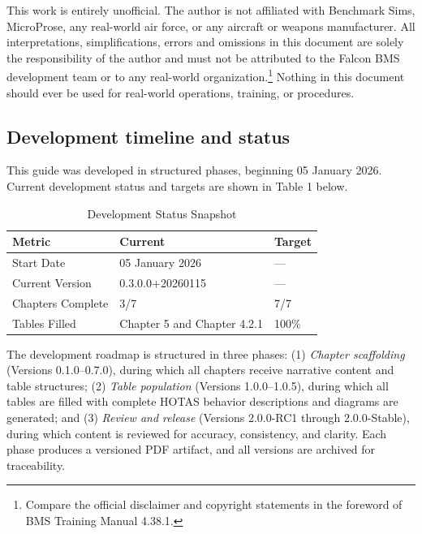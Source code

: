 \documentclass[11pt,a4paper]{article}
\providecommand{\trnman}{BMS Training Manual 4.38.1}
\newcommand{\docversion}{0.3.0.0} %
\newcommand{\docbuild}{20260115}
\newcommand{\docstartdate}{05 January 2026}
\newcommand{\chapterscompletedof}{3/7}
\newcommand{\tablesfilledpct}{Chapter 5 and Chapter 4.2.1}
\newcommand{\fulldocversion}{\docversion+\docbuild} %
\begin{document}
This work is entirely unofficial. The author is not affiliated with Benchmark Sims, MicroProse, any real-world air force, or any aircraft or weapons manufacturer. All interpretations, simplifications, errors and omissions in this document are solely the responsibility of the author and must not be attributed to the Falcon BMS development team or to any real-world organization.\footnote{Compare the official disclaimer and copyright statements in the foreword of \trnman{}.} Nothing in this document should ever be used for real-world operations, training, or procedures.

\subsection{Development timeline and status}

This guide was developed in structured phases, beginning \docstartdate{}. Current development status and targets are shown in Table 1 below.

\begin{table}[h]
\centering
\caption{Development Status Snapshot}
\begin{tabular}{L{3.2cm} L{2.5cm} L{2.5cm}}
\toprule
\textbf{Metric} & \textbf{Current} & \textbf{Target} \\
\midrule
Start Date & \docstartdate & --- \\
Current Version & \fulldocversion & --- \\
Chapters Complete & \chapterscompletedof & 7/7 \\
Tables Filled & \tablesfilledpct & 100\% \\
\bottomrule
\end{tabular}
\end{table}

The development roadmap is structured in three phases: (1) \emph{Chapter scaffolding} (Versions 0.1.0--0.7.0), during which all chapters receive narrative content and table structures; (2) \emph{Table population} (Versions 1.0.0--1.0.5), during which all tables are filled with complete HOTAS behavior descriptions and diagrams are generated; and (3) \emph{Review and release} (Versions 2.0.0-RC1 through 2.0.0-Stable), during which content is reviewed for accuracy, consistency, and clarity. Each phase produces a versioned PDF artifact, and all versions are archived for traceability.
\end{document}
